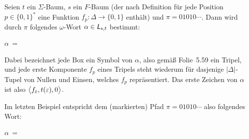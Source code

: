 \documentclass[fontsize=11pt, twoside=false, numbers=autoenddot]{scrbook}
\begin{document}
Seien $t$ ein $\Sigma$-Baum, $s$ ein $F$-Baum (der nach Definition
für jede Position $p \in \{0,1\}^*$ eine Funktion $f_p : \Delta \to \{0,1\}$ enthält)
und $\pi = 01010\cdots$.
Dann wird durch $\pi$ folgendes $\omega$-Wort $\alpha \in \textsf{\textit{L}}_{s,t}$ bestimmt:
%
\begin{center}
  $\alpha ~= {}$
  \newcommand{\Tripel}[3]{
    $\left\langle
      \begin{array}{@{}c@{}}#1\\[1pt]#2\\[1pt]#3\end{array}%
    \right\rangle$
  }%
\end{center}
%
Dabei bezeichnet jede Box ein Symbol von $\alpha$, also gemäß Folie~5.59 ein Tripel,
und jede erste Komponente $f_p$ eines Tripels
steht wiederum für dasjenige $|\Delta|$-Tupel von Nullen und Einsen,
welches $f_p$ repräsentiert.
Das erste Zeichen von $\alpha$ ist also $\big\langle f_\varepsilon,t(\varepsilon),0\big\rangle$.

Im letzten Beispiel entspricht dem (markierten) Pfad
$\pi = 01010\cdots$ also folgendes Wort:
%
\begin{center}
  $\alpha ~= {}$
  \newcommand{\Tripel}[3]{
    $\left\langle
      \begin{array}{@{}c@{}}#1\\[-1pt]#2\\[-1pt]#3\end{array}\,%
    \right\rangle$
  }%
\end{center}
%
\end{document}
